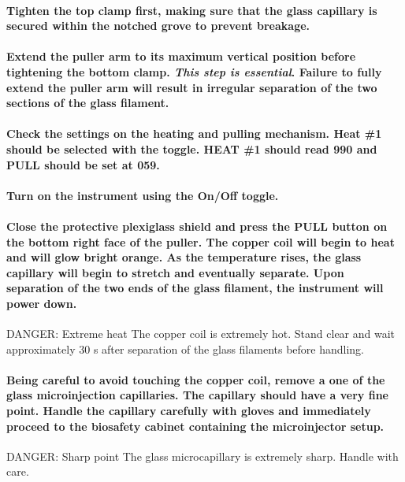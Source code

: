 \documentclass[11pt]{article}
\newcommand\dangersign[1][4ex]{\renewcommand\stacktype{L}\scaleto{\stackon[1pt]{\color{red}$\triangle$}{\tiny !}}{#1}}
\begin{document}
\paragraph{{\sffamily } Tighten the top clamp first, making sure that the glass capillary is secured within the notched grove to prevent breakage.}
\label{sec:orgheadline24}
\paragraph{{\sffamily } Extend the puller arm to its maximum vertical position before tightening the bottom clamp. \textbf{\emph{This step is essential}}. Failure to fully extend the puller arm will result in irregular separation of the two sections of the glass filament.}
\label{sec:orgheadline25}
\paragraph{{\sffamily } Check the settings on the heating and pulling mechanism. Heat \#1 should be selected with the toggle. HEAT \#1 should read 990 and PULL should be set at 059.}
\label{sec:orgheadline26}
\paragraph{{\sffamily } Turn on the instrument using the On/Off toggle.}
\label{sec:orgheadline27}
\paragraph{{\sffamily } Close the protective plexiglass shield and press the PULL button on the bottom right face of the puller. The copper coil will begin to heat and will glow bright orange. As the temperature rises, the glass capillary will begin to stretch and eventually separate. Upon separation of the two ends of the glass filament, the instrument will power down.\\}
\label{sec:orgheadline28}
\begin{bclogo}[logo=\dangersign, couleurBarre=red, noborder=true, couleur=yellow!20]{     DANGER: Extreme heat}
The copper coil is extremely hot. Stand clear and wait approximately 30 s after separation of the glass filaments before handling.\\
\end{bclogo}
\paragraph{{\sffamily } Being careful to avoid touching the copper coil, remove a one of the glass microinjection capillaries. The capillary should have a very fine point. Handle the capillary carefully with gloves and immediately proceed to the biosafety cabinet containing the microinjector setup. \\}
\label{sec:orgheadline29}
\begin{bclogo}[logo=\dangersign, couleurBarre=red, noborder=true, couleur=yellow!20]{     DANGER: Sharp point}
The glass microcapillary is extremely sharp. Handle with care.\\
\end{bclogo}
\end{document}
